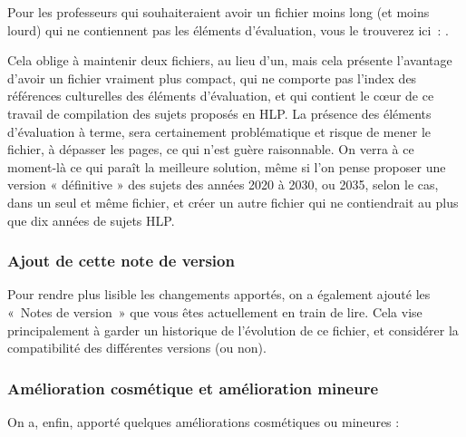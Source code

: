 Pour les professeurs qui souhaiteraient avoir un fichier moins long (et moins lourd) qui ne contiennent pas les éléments d'évaluation, vous le trouverez ici~: \sujetshlpsanscorr{}.

Cela oblige à maintenir deux fichiers, au lieu d'un, mais cela présente l'avantage d'avoir un fichier vraiment plus compact, qui ne comporte pas l'index des références culturelles des éléments d'évaluation, et qui contient le cœur de ce travail de compilation des sujets proposés en HLP. La présence des éléments d'évaluation à terme, sera certainement problématique et risque de mener le fichier, à dépasser les  pages, ce qui n'est guère raisonnable. On verra à ce moment-là ce qui paraît la meilleure solution, même si l'on pense proposer une version « définitive »{} des sujets des années 2020 à 2030, ou 2035, selon le cas, dans un seul et même fichier, et créer un autre fichier qui ne contiendrait au plus que dix années de sujets HLP.

\subsubsection{Ajout de cette note de version}

Pour rendre plus lisible les changements apportés, on a également ajouté les «~Notes de version~» que vous êtes actuellement en train de lire. Cela vise principalement à garder un historique de l'évolution de ce fichier, et considérer la compatibilité des différentes versions (ou non).

\subsubsection{Amélioration cosmétique et amélioration mineure}

On a, enfin, apporté quelques améliorations cosmétiques ou mineures :

